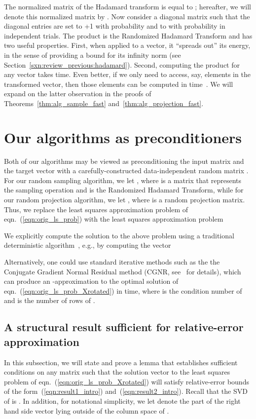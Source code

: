 \documentclass[11pt]{article}
\begin{document}
The  normalized matrix of the Hadamard transform is equal to ; hereafter, we will denote this normalized matrix by . Now consider a diagonal matrix  such that the diagonal entries  are set to +1 with probability  and to  with probability  in  independent trials. The product  is the Randomized Hadamard Transform and has two useful properties. First, when applied to a vector, it ``spreads out'' its energy, in the sense of providing a bound for its infinity norm (see Section~\ref{sxn:review_previous:hadamard}). Second, computing the product  for any vector  takes  time. Even better, if we only need to access, say,  elements in the transformed vector, then those  elements can be computed in  time~\cite{AL08}. We will expand on the latter observation in the proofs of Theorems~\ref{thm:alg_sample_fast} and~\ref{thm:alg_projection_fast}.


\section{Our algorithms as preconditioners}\label{sxn:precond}

Both of our algorithms may be viewed as preconditioning the input matrix  and the target vector  with a carefully-constructed data-independent random matrix . For our random sampling algorithm, we let , where  is a matrix that represents the sampling operation and  is the Randomized Hadamard Transform, while for our random projection algorithm, we let , where  is a random projection matrix. Thus, we replace the least squares approximation problem of eqn.~(\ref{eqn:orig_ls_prob}) with the least squares approximation problem

We explicitly compute the solution to the above problem using a traditional deterministic algorithm~\cite{GVL96}, e.g., by computing the vector

Alternatively, one could use standard iterative methods such as the the Conjugate Gradient Normal Residual method (CGNR, see~\cite{GVL96} for details), which can produce an -approximation to the optimal solution of eqn.~(\ref{eqn:orig_ls_prob_Xrotated}) in  time, where  is the condition number of  and  is the number of rows of .

\subsection{A structural result sufficient for relative-error approximation}
\label{sxn:sampling:proofs:structural}

In this subsection, we will state and prove a lemma that establishes sufficient conditions on any matrix  such that the solution vector  to the least squares problem of eqn.~(\ref{eqn:orig_ls_prob_Xrotated}) will satisfy relative-error bounds of the form~(\ref{eqn:result1_intro}) and~(\ref{eqn:result2_intro}). Recall that the SVD of  is . In addition, for notational simplicity, we let  denote the  part of the right hand side vector  lying outside of the column space of .
\end{document}
